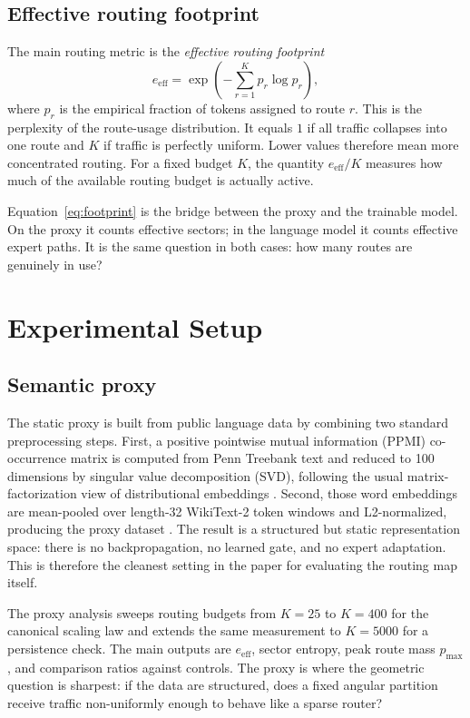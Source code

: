 \documentclass[10pt,letterpaper]{article}
\begin{document}
\subsection{Effective routing footprint}
The main routing metric is the \emph{effective routing footprint}
\begin{equation}
e_{\mathrm{eff}} = \exp\!\left(-\sum_{r=1}^{K} p_r \log p_r\right),
\label{eq:footprint}
\end{equation}
where $p_r$ is the empirical fraction of tokens assigned to route $r$. This is the perplexity of the route-usage distribution. It equals $1$ if all traffic collapses into one route and $K$ if traffic is perfectly uniform. Lower values therefore mean more concentrated routing. For a fixed budget $K$, the quantity $e_{\mathrm{eff}}/K$ measures how much of the available routing budget is actually active.

Equation~\eqref{eq:footprint} is the bridge between the proxy and the trainable model. On the proxy it counts effective sectors; in the language model it counts effective expert paths. It is the same question in both cases: how many routes are genuinely in use?

\section{Experimental Setup}
\subsection{Semantic proxy}
The static proxy is built from public language data by combining two standard preprocessing steps. First, a positive pointwise mutual information (PPMI) co-occurrence matrix is computed from Penn Treebank text \citep{ptb1993} and reduced to 100 dimensions by singular value decomposition (SVD), following the usual matrix-factorization view of distributional embeddings \citep{levy2014neural}. Second, those word embeddings are mean-pooled over length-32 WikiText-2 token windows \citep{merity2016wt2} and L2-normalized, producing the proxy dataset . The result is a structured but static representation space: there is no backpropagation, no learned gate, and no expert adaptation. This is therefore the cleanest setting in the paper for evaluating the routing map itself.

The proxy analysis sweeps routing budgets from $K=25$ to $K=400$ for the canonical scaling law and extends the same measurement to $K=5000$ for a persistence check. The main outputs are $e_{\mathrm{eff}}$, sector entropy, peak route mass $p_{\max}$, and comparison ratios against controls. The proxy is where the geometric question is sharpest: if the data are structured, does a fixed angular partition receive traffic non-uniformly enough to behave like a sparse router?
\end{document}
